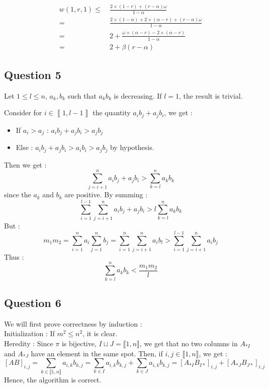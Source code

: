 \documentclass{Cours}
\begin{document}
\begin{itemize}
\[\begin{aligned}
                        w(1, r, 1)  \leq &\ \frac{2 \times \left(1 - r\right) + \left(r - \alpha\right)\omega}{1 - \alpha}\\
                        = &\ \frac{2 \times \left(1 - \alpha\right) + 2 \times \left(\alpha - r\right) + \left(r - \alpha\right) \omega}{1 - \alpha}\\
                        = &\ 2 + \frac{\omega \times \left(\alpha - r\right) - 2 \times \left(\alpha - r\right)}{1 - \alpha}\\
                        = &\ 2 + \beta(r - \alpha)
                    \end{aligned}
                \]
            \end{itemize}
            
        \subsection{Question 5}
            Let $1 \leq l \leq n$, $a_{k}, b_{k}$ such that $a_{k}b_{k}$ is decreasing.
            If $l = 1$, the result is trivial. 
        
            Consider for $i \in \left\llbracket 1, l - 1\right\rrbracket$ the quantity $a_{i}b_{j} + a_{j}b_{i}$, we get :
            \begin{itemize}
                \item If $a_{i} > a_{j}$ : $a_{i}b_{j} + a_{j}b_{i} > a_{j}b_{j}$
                \item Else : $a_{i}b_{j} + a_{j}b_{i} > a_{i}b_{i} > a_{j}b_{j}$ by hypothesis.
            \end{itemize}

            Then we get : 
            \[\sum_{j = i + 1}^{n} a_{i}b_{j} + a_{j}b_{i} > \sum_{k = l}^{n} a_{k}b_{k}\] since the $a_{k}$ and $b_{k}$ are positive.
            By summing :  
            \[\sum_{i = 1}^{l -1}\sum_{j = i + 1}^{n} a_{i}b_{j} + a_{j}b_{i} > l\sum_{k = l}^{n} a_{k}b_{k}\]
            But : 
            \[m_{1}m_{2} = \sum_{i = 1}^{n}a_{i} \sum_{j = 1}^{n}b_{j} = \sum_{i = 1}^{n}\sum_{j = i + 1}^{n}a_{i}b_{l} > \sum_{i = 1}^{l - 1}\sum_{j = i + 1}^{n}a_{i}b_{j}\]
            Thus :
            \[\sum_{k = l}^{n} a_{k}b_{k} < \frac{m_{1}m_{2}}{l}\]

        \subsection{Question 6}
        We will first prove correctness by induction : \\
        Initialization : If $m^{2} \leq n^{2}$, it is clear.\\
        Heredity : Since $\pi$ is bijective, $I\sqcup J = \llbracket 1, n \rrbracket$, we get that no two columns in $A_{*I}$ and $A_{*J}$ have an element in the same spot. Then, if $i, j \in \llbracket 1, n \rrbracket$, we get : 
        \[
            \left[AB\right]_{i, j} = \sum_{k\in \llbracket 1, n\rrbracket} a_{i, k}b_{k, j} = \sum_{k\in I}a_{i, k}b_{k,j} + \sum_{k \in J}a_{i,k}b_{k,j} = \left[A_{*I}B_{I*}\right]_{i, j} + \left[A_{*J}B_{J*}\right]_{i, j}
        \]
        Hence, the algorithm is correct.
\end{document}
